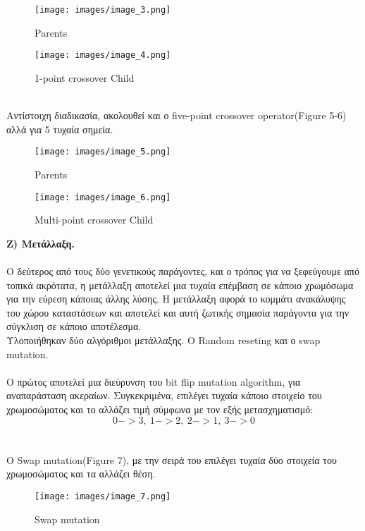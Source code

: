 \documentclass[12pt]{article}
\begin{document}
\begin{figure}[!h]
\centering
\begin{minipage}{.5\textwidth}
  \centering
  \texttt{[image: images/image\_3.png]}
  \caption{Parents}
  \label{fig:my_label}
\end{minipage}%
\begin{minipage}{.5\textwidth}
  \centering
  \texttt{[image: images/image\_4.png]}
  \caption{1-point crossover Child}
  \label{fig:my_label}
\end{minipage}
\end{figure}
\\Αντίστοιχη διαδικασία, ακολουθεί και ο five-point crossover operator(Figure 5-6) αλλά για 5 τυχαία σημεία.\\

\begin{figure}[!h]
\centering
\begin{minipage}{.5\textwidth}
  \centering
  \texttt{[image: images/image\_5.png]}
  \caption{Parents}
  \label{fig:my_label}
\end{minipage}%
\begin{minipage}{.5\textwidth}
  \centering
  \texttt{[image: images/image\_6.png]}
  \caption{Multi-point crossover Child}
  \label{fig:my_label}
\end{minipage}
\end{figure}

{\bfseries Ζ) Μετάλλαξη.}\\\\
Ο δεύτερος από τους δύο γενετικούς παράγοντες, και ο τρόπος για να ξεφεύγουμε από τοπικά ακρότατα, η μετάλλαξη αποτελεί μια τυχαία επέμβαση σε κάποιο χρωμόσωμα για την εύρεση κάποιας άλλης λύσης. Η μετάλλαξη αφορά το κομμάτι ανακάλυψης του χώρου καταστάσεων και αποτελεί και αυτή ζωτικής σημασία παράγοντα για την σύγκλιση σε κάποιο αποτέλεσμα.\\
Υλοποιήθηκαν δύο αλγόριθμοι μετάλλαξης. O Random reseting και ο swap mutation.\\\\
Ο πρώτος αποτελεί μια διεύρυνση του bit flip mutation algorithm, για αναπαράσταση ακεραίων. Συγκεκριμένα, επιλέγει τυχαία κάποιο στοιχείο του χρωμοσώματος και το αλλάζει τιμή σύμφωνα με τον εξής μετασχηματισμό:\[0->3 ,\ 1->2 ,\ 2->1 ,\ 3->0\]
\\\\ O Swap mutation(Figure 7), με την σειρά του επιλέγει τυχαία δύο στοιχεία του χρωμοσώματος και τα αλλάζει θέση.
\begin{figure}[!h]
    \centering
    \texttt{[image: images/image\_7.png]}
    \caption{Swap mutation}
    \label{fig:my_label}
\end{figure}
\end{document}
